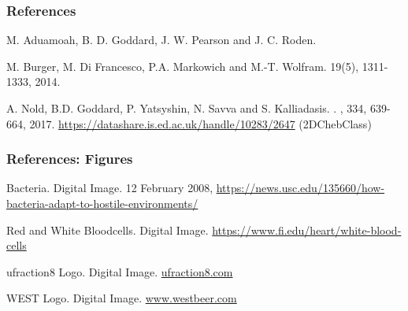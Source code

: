 \documentclass[aspectratio=169,xcolor=dvipsnames]{beamer}
\begin{document}
\begin{frame}
\frametitle{References}    
\begin{thebibliography}{10}    

	M. Aduamoah, B. D. Goddard, J. W. Pearson and J. C. Roden.
	
	M. Burger, M. Di Francesco, P.A. Markowich and  M.-T. Wolfram. 
	 19(5), 1311-1333, 2014. 	
	
	A. Nold, B.D. Goddard, P. Yatsyshin, N. Savva and S. Kalliadasis. 
	.
	, 334, 639-664, 2017.
	\newblock \url{https://datashare.is.ed.ac.uk/handle/10283/2647} (2DChebClass)
\end{thebibliography}
\end{frame}
\begin{frame}
	\frametitle{References: Figures}   
	\begin{thebibliography}{10}    
		
		Bacteria. Digital Image. 12 February 2008, \url{https://news.usc.edu/135660/how-bacteria-adapt-to-hostile-environments/}

		Red and White Bloodcells. Digital Image. \url{https://www.fi.edu/heart/white-blood-cells}

		ufraction8 Logo. Digital Image. 
		\url{ufraction8.com}
		
		WEST Logo. Digital Image.  \url{www.westbeer.com}
	\end{thebibliography}	
\end{frame}
\end{document}
